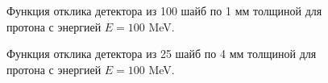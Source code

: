 \documentclass{config}
\begin{document}
\begin{figure}[h]
\begin{minipage}[h]{0.45\linewidth}
    \caption{Функция отклика детектора из 100 шайб по 1 мм толщиной для протона с энергией $E = 100$ MeV.}
    \label{K}
\end{minipage}
\hfill
\begin{minipage}[h]{0.45\linewidth}
    \caption{Функция отклика детектора из 25 шайб по 4 мм толщиной для протона с энергией $E = 100$ MeV.}
    \label{K_25}
\end{minipage}
\end{figure}
\end{document}
